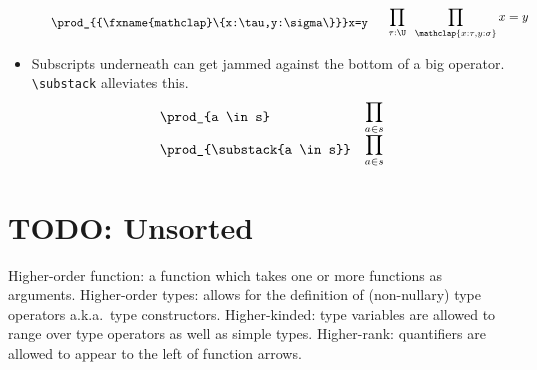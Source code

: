 \documentclass[11pt]{article} %
\makeatletter
\newcommand\ldisplaycell[1]{\begin{array}[c]{@{}l@{}}\displaystyle {#1}\end{array}}
\theoremstyle{definition}
\theoremstyle{remark}
\makeatother
\begin{document}
\begin{itemize}
\[\begin{array}{lll}
\begin{array}[c]{@{}l@{}}
        \quad\verb/\prod_{\mathclap{x:\tau,y:\sigma}}x=y/
      \end{array} & \ldisplaycell{\;\:\,
        \prod_{\tau:\U}\;\;\prod_{\mathclap{ x:\tau,y:\sigma}}x=y } \\
  \end{array}\]
\item
  Subscripts underneath can get jammed against the bottom of a big operator.
  \verb!\substack! alleviates this.
  \[\begin{array}{lll}
    \verb/\prod_{a \in s}/ & \ldisplaycell{ \prod_{a \in s} } \\
    \verb/\prod_{\substack{a \in s}}/ & \ldisplaycell{ \prod_{\substack{a \in s}} } \\
  \end{array}\]
\end{itemize}





\part{TODO: Unsorted}


Higher-order function: a function which takes one or more functions as arguments.
Higher-order types: allows for the definition of (non-nullary) type operators a.k.a.\ type constructors.
Higher-kinded: type variables are allowed to range over type operators as well as simple types.
Higher-rank: quantifiers are allowed to appear to the left of function arrows.
\end{document}
